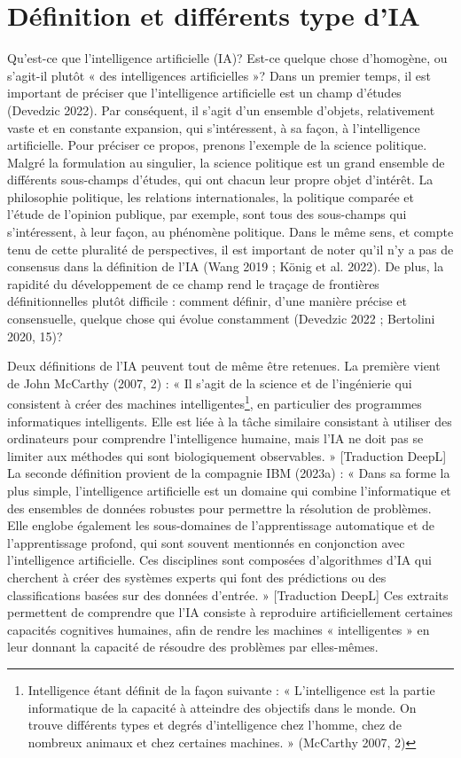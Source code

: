 \documentclass[
  letterpaper,
]{scrbook}
\begin{document}
\hypertarget{duxe9finition-et-diffuxe9rents-type-dia}{%
\section{Définition et différents type
d'IA}\label{duxe9finition-et-diffuxe9rents-type-dia}}

Qu'est-ce que l'intelligence artificielle (IA)? Est-ce quelque chose
d'homogène, ou s'agit-il plutôt « des intelligences artificielles »?
Dans un premier temps, il est important de préciser que l'intelligence
artificielle est un champ d'études (Devedzic 2022). Par conséquent, il
s'agit d'un ensemble d'objets, relativement vaste et en constante
expansion, qui s'intéressent, à sa façon, à l'intelligence artificielle.
Pour préciser ce propos, prenons l'exemple de la science politique.
Malgré la formulation au singulier, la science politique est un grand
ensemble de différents sous-champs d'études, qui ont chacun leur propre
objet d'intérêt. La philosophie politique, les relations
internationales, la politique comparée et l'étude de l'opinion publique,
par exemple, sont tous des sous-champs qui s'intéressent, à leur façon,
au phénomène politique. Dans le même sens, et compte tenu de cette
pluralité de perspectives, il est important de noter qu'il n'y a pas de
consensus dans la définition de l'IA (Wang 2019 ; König et al. 2022). De
plus, la rapidité du développement de ce champ rend le traçage de
frontières définitionnelles plutôt difficile : comment définir, d'une
manière précise et consensuelle, quelque chose qui évolue constamment
(Devedzic 2022 ; Bertolini 2020, 15)?

Deux définitions de l'IA peuvent tout de même être retenues. La première
vient de John McCarthy (2007, 2) : « Il s'agit de la science et de
l'ingénierie qui consistent à créer des machines
intelligentes\footnote{Intelligence étant définit de la façon suivante :
  « L'intelligence est la partie informatique de la capacité à atteindre
  des objectifs dans le monde. On trouve différents types et degrés
  d'intelligence chez l'homme, chez de nombreux animaux et chez
  certaines machines. » (McCarthy 2007, 2)}, en particulier des
programmes informatiques intelligents. Elle est liée à la tâche
similaire consistant à utiliser des ordinateurs pour comprendre
l'intelligence humaine, mais l'IA ne doit pas se limiter aux méthodes
qui sont biologiquement observables. » {[}Traduction DeepL{]} La seconde
définition provient de la compagnie IBM (2023a) : « Dans sa forme la
plus simple, l'intelligence artificielle est un domaine qui combine
l'informatique et des ensembles de données robustes pour permettre la
résolution de problèmes. Elle englobe également les sous-domaines de
l'apprentissage automatique et de l'apprentissage profond, qui sont
souvent mentionnés en conjonction avec l'intelligence artificielle. Ces
disciplines sont composées d'algorithmes d'IA qui cherchent à créer des
systèmes experts qui font des prédictions ou des classifications basées
sur des données d'entrée. » {[}Traduction DeepL{]} Ces extraits
permettent de comprendre que l'IA consiste à reproduire artificiellement
certaines capacités cognitives humaines, afin de rendre les machines «
intelligentes » en leur donnant la capacité de résoudre des problèmes
par elles-mêmes.
\end{document}
